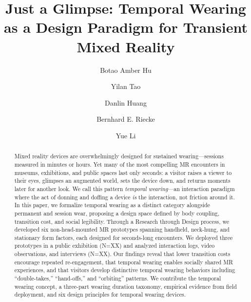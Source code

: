 \documentclass[acmsmall]{acmart}
\begin{document}
\title{Just a Glimpse: Temporal Wearing as a Design Paradigm for Transient Mixed Reality}

\author{Botao Amber Hu}

\author{Yilan Tao}

\author{Danlin Huang}

\author{Bernhard E. Riecke}

\author{Yue Li}

\begin{abstract}
Mixed reality devices are overwhelmingly designed for sustained wearing---sessions measured in minutes or hours. Yet many of the most compelling MR encounters in museums, exhibitions, and public spaces last only seconds: a visitor raises a viewer to their eyes, glimpses an augmented world, sets the device down, and returns moments later for another look. We call this pattern \textit{temporal wearing}---an interaction paradigm where the act of donning and doffing a device \textit{is} the interaction, not friction around it. In this paper, we formalize temporal wearing as a distinct category alongside permanent and session wear, proposing a design space defined by body coupling, transition cost, and social legibility. Through a Research through Design process, we developed six non-head-mounted MR prototypes spanning handheld, neck-hung, and stationary form factors, each designed for seconds-long encounters. We deployed three prototypes in a public exhibition (N=XX) and analyzed interaction logs, video observations, and interviews (N=XX). Our findings reveal that lower transition costs encourage repeated re-engagement, that temporal wearing enables socially shared MR experiences, and that visitors develop distinctive temporal wearing behaviors including ``double-takes,'' ``hand-offs,'' and ``orbiting'' patterns. We contribute the temporal wearing concept, a three-part wearing duration taxonomy, empirical evidence from field deployment, and six design principles for temporal wearing devices.
\end{abstract}
\end{document}
